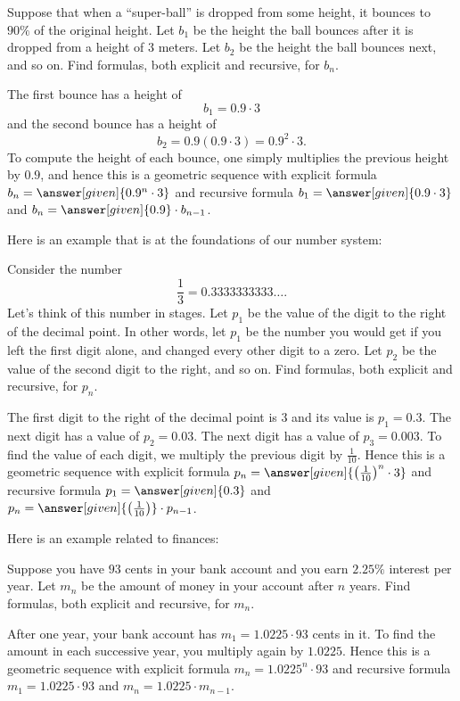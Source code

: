 \documentclass{ximera}
\begin{document}
\begin{example}
  Suppose that when a ``super-ball'' is dropped from some height, it
  bounces to $90\%$ of the original height. Let $b_1$ be the height
  the ball bounces after it is dropped from a height of $3$
  meters. Let $b_2$ be the height the ball bounces next, and so on.
  Find formulas, both explicit and recursive, for $b_n$.
  \begin{explanation}
    The first bounce has a height of
    \[
    b_1 = 0.9\cdot 3
    \]
    and the second bounce has a height of 
    \[
    b_2 = 0.9(0.9\cdot 3) = 0.9^2 \cdot 3.
    \]
     To compute the height of each bounce, one simply multiplies the
    previous height by $0.9$, and hence this is a geometric sequence with
    explicit formula $b_n = \answer[given]{0.9^n\cdot 3}$ and recursive formula $b_1 =
    \answer[given]{0.9\cdot 3}$ and $b_n = \answer[given]{0.9}\cdot b_{n-1}$.
  \end{explanation}
\end{example}


Here is an example that is at the foundations of our number system:

\begin{example}
  Consider the number
  \[
  \frac{1}{3} = 0.3333333333\dots.
  \]
  Let's think of this number in stages.  Let $p_1$ be the value of the digit to the right of the decimal
  point.  In other words, let $p_1$ be the number you would get if you left the first digit alone, and changed every other digit to a zero. Let $p_2$ be the value of the second digit to the right, and so
  on. Find formulas, both explicit and recursive, for $p_n$.
  \begin{explanation}
    The first digit to the right of the decimal point is $3$ and its
    value is $p_1 = 0.3$. The next digit has a value of $p_2 =
    0.03$. The next digit has a value of $p_3 = 0.003$. To find the
    value of each digit, we multiply the previous digit by
    $\frac{1}{10}$. Hence this is a geometric sequence with explicit
    formula $p_n = \answer[given]{\left(\frac{1}{10}\right)^n\cdot 3}$ and recursive
    formula $p_1 =\answer[given]{0.3}$ and $p_n = \answer[given]{\left(\frac{1}{10}\right)}\cdot
    p_{n-1}$.
  \end{explanation}
\end{example}


Here is an example related to finances:
\begin{example}
  Suppose you have $93$ cents in your bank account and you earn
  $2.25\%$ interest per year. Let $m_n$ be the amount of money in your
  account after $n$ years. Find formulas, both explicit and recursive,
  for $m_n$.
  \begin{explanation}
    After one year, your bank account has $m_1 = 1.0225\cdot 93$ cents
    in it. To find the amount in each successive year, you multiply
    again by $1.0225$. Hence this is a geometric sequence with
    explicit formula $m_n = 1.0225^n\cdot 93$ and recursive formula
    $m_1 =1.0225\cdot 93$ and $m_n = 1.0225\cdot m_{n-1}$.
  \end{explanation}
\end{example}
\end{document}
